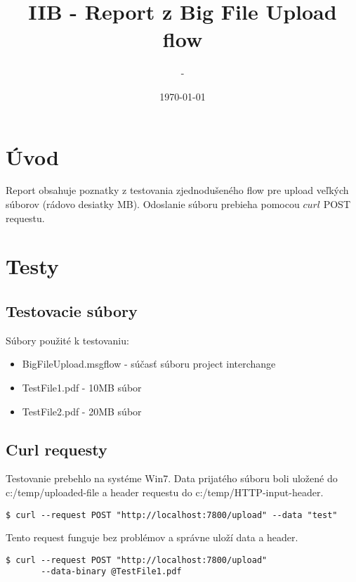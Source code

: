 \documentclass[a4paper]{article}
\begin{document}
\title{IIB - Report z Big File Upload flow}
\author{-} %
\date{\today}
\maketitle

\section{Úvod}

Report obsahuje poznatky z testovania zjednodušeného flow pre upload veľkých súborov (rádovo desiatky MB).
Odoslanie súboru prebieha pomocou $curl$ POST requestu.

\section{Testy}

\subsection{Testovacie súbory}

Súbory použité k testovaniu:
\begin{itemize}
	\item BigFileUpload.msgflow - súčasť súboru project interchange
	\item TestFile1.pdf - 10MB súbor
	\item TestFile2.pdf - 20MB súbor
\end{itemize}

\subsection{Curl requesty}

Testovanie prebehlo na systéme Win7. Data prijatého súboru boli uložené do c:/temp/uploaded-file a header requestu do c:/temp/HTTP-input-header.

\lstset{title=Vstup, language=bash}
\begin{lstlisting}
$ curl --request POST "http://localhost:7800/upload" --data "test"
\end{lstlisting}

Tento request funguje bez problémov a správne uloží data a header.

\lstset{title=Vstup, language=bash}
\begin{lstlisting}
$ curl --request POST "http://localhost:7800/upload" 
	   --data-binary @TestFile1.pdf
\end{lstlisting}
\end{document}
